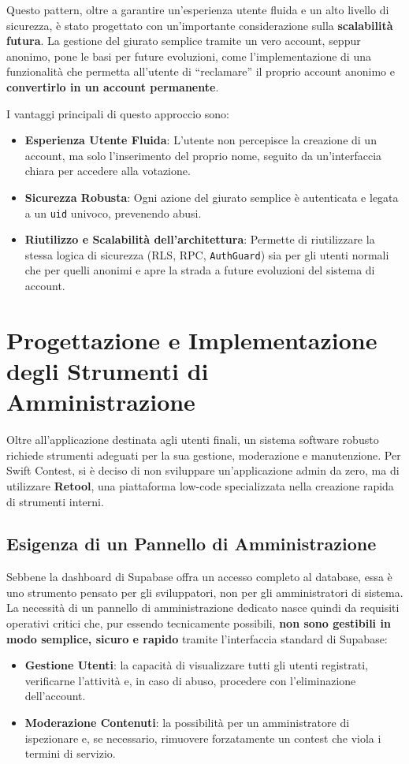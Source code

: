 Questo pattern, oltre a garantire un'esperienza utente fluida e un alto livello di sicurezza, è stato progettato con un'importante considerazione sulla \textbf{scalabilità futura}.
La gestione del giurato semplice tramite un vero account, seppur anonimo, pone le basi per future evoluzioni, come l'implementazione di una funzionalità che permetta all'utente di ``reclamare'' il proprio account anonimo e \textbf{convertirlo in un account permanente}.

I vantaggi principali di questo approccio sono:
\begin{itemize}
    \item \textbf{Esperienza Utente Fluida}: L'utente non percepisce la creazione di un account, ma solo l'inserimento del proprio nome, seguito da un'interfaccia chiara per accedere alla votazione.
    \item \textbf{Sicurezza Robusta}: Ogni azione del giurato semplice è autenticata e legata a un \texttt{uid} univoco, prevenendo abusi.
    \item \textbf{Riutilizzo e Scalabilità dell'architettura}: Permette di riutilizzare la stessa logica di sicurezza (RLS, RPC, \texttt{AuthGuard}) sia per gli utenti normali che per quelli anonimi e apre la strada a future evoluzioni del sistema di account.
\end{itemize}

\section{Progettazione e Implementazione degli Strumenti di Amministrazione}
\label{sec:admin_tools}

Oltre all'applicazione destinata agli utenti finali, un sistema software robusto richiede strumenti adeguati per la sua gestione, moderazione e manutenzione.
Per Swift Contest, si è deciso di non sviluppare un'applicazione admin da zero, ma di utilizzare \textbf{Retool}, una piattaforma low-code specializzata nella creazione rapida di strumenti interni.

\subsection{Esigenza di un Pannello di Amministrazione}\label{subsec:esigenza-di-un-pannello-di-amministrazione}
Sebbene la dashboard di Supabase offra un accesso completo al database, essa è uno strumento pensato per gli sviluppatori, non per gli amministratori di sistema.
La necessità di un pannello di amministrazione dedicato nasce quindi da requisiti operativi critici che, pur essendo tecnicamente possibili, \textbf{non sono gestibili in modo semplice, sicuro e rapido} tramite l'interfaccia standard di Supabase:
\begin{itemize}
    \item \textbf{Gestione Utenti}: la capacità di visualizzare tutti gli utenti registrati, verificarne l'attività e, in caso di abuso, procedere con l'eliminazione dell'account.
    \item \textbf{Moderazione Contenuti}: la possibilità per un amministratore di ispezionare e, se necessario, rimuovere forzatamente un contest che viola i termini di servizio.
\end{itemize}

